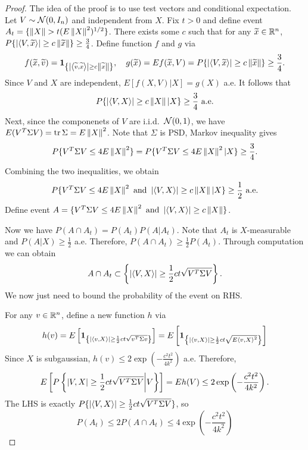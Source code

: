 \documentclass[a4paper]{article}
\begin{document}
\begin{proof}
  The idea of the proof is to use test vectors and conditional
  expectation. Let $V \sim \mathcal{N} (0, I_n)$ and independent from $X$.
  Fix $t > 0$ and define event
  $A_t = \{ \left\lVert X\right\rVert > t (E \left\lVert X\right\rVert^2)^{1/2} \}$.
  There exists some $c$ such that for any $\widetilde{x} \in \mathbb{R}^n$,
  $P \{ \left\lvert \left\langle V, \widetilde{x} \right\rangle\right\rvert \geq c \left\lVert \widetilde{x}\right\rVert \} \geq
    \frac{3}{4}$. Define function $f$ and $g$ via
  \[
    f(\widetilde{x}, \widetilde{v}) = \operatorname{\mathbf{1}}_{\left\{ \left\lvert \left\langle \widetilde{v},
        \widetilde{x} \right\rangle\right\rvert \geq c \left\lVert \widetilde{x}\right\rVert \right\}},
    \quad
    g(\widetilde{x}) = E f(\widetilde{x}, V)
    = P \{ \left\lvert \left\langle V, \widetilde{x} \right\rangle\right\rvert \geq c \left\lVert \widetilde{x}\right\rVert\}
    \geq \frac{3}{4}.
  \]
  Since $V$ and $X$ are independent, $E [f(X, V) | X] = g(X)$ a.e.
  It follows that
  \[
    P \{ \left\lvert \left\langle V, X \right\rangle\right\rvert \geq c \left\lVert X\right\rVert | X \} \geq \frac{3}{4} \text{ a.e.}
  \]
  Next, since the componenets of $V$ are i.i.d.\ $\mathcal{N}(0, 1)$,
  we have $E (V^T \Sigma V) = \operatorname{tr} \Sigma = E \left\lVert X\right\rVert^2$.
  Note that $\Sigma$ is PSD, Markov inequality gives
  \[
    P \{ V^T \Sigma V \leq 4 E \left\lVert X\right\rVert^2 \}
    = P \{ V^T \Sigma V \leq 4 E \left\lVert X\right\rVert^2 | X \}
    \geq \frac{3}{4}.
  \]
  Combining the two inequalities, we obtain
  \[
    P \{ V^T \Sigma V \leq 4 E \left\lVert X\right\rVert^2 \text{ and }
    \left\lvert \left\langle V, X \right\rangle\right\rvert \geq c \left\lVert X\right\rVert | X \}
    \geq \frac{1}{2} \text{ a.e.}
  \]
  Define event $A = \{ V^T \Sigma V \leq 4 E \left\lVert X\right\rVert^2 \text{ and }
    \left\lvert \left\langle V, X \right\rangle\right\rvert \geq c \left\lVert X\right\rVert \}$.

  Now we have $P(A \cap A_t) = P(A_t) P(A | A_t)$. Note that
  $A_t$ is $X$-measurable and $P( A | X ) \geq \frac{1}{2}$
  a.e. Therefore, $P(A \cap A_t) \geq \frac{1}{2} P(A_t)$.
  Through computation we can obtain
  \[
    A \cap A_t \subset \left\{ \left\lvert  \left\langle V, X \right\rangle \right\rvert
    \geq \frac{1}{2} ct \sqrt{V^T \Sigma V} \right\}.
  \]
  We now just need to bound the probability of the event on RHS.

  For any $v \in \mathbb{R}^n$, define a new function $h$ via
  \begin{align*}
    h (v)
    = E \left[ \operatorname{\mathbf{1}}_{ \left\{ \left\lvert \left\langle v, X \right\rangle\right\rvert \geq \frac{1}{2}
            c t \sqrt{ v^T \Sigma v} \right\} } \right]
    = E \left[ \operatorname{\mathbf{1}}_{ \left\{ \left\lvert \left\langle v, X \right\rangle\right\rvert \geq \frac{1}{2} c t
            \sqrt{E \left\langle v, X \right\rangle^2} \right\} } \right]
  \end{align*}
  Since $X$ is subgaussian, $h(v) \leq 2 \exp \left( - \frac{c^2 t^2}{4 k^2} \right)$ a.e.
  Therefore,
  \[
    E \left[ P \left\{ \left\lvert V, X\right\rvert \geq \frac{1}{2} c t \sqrt{V^T \Sigma V} \middle| V \right\} \right]
    = E h (V) \leq 2 \exp \left( - \frac{c^2 t^2}{4 k^2} \right).
  \]
  The LHS is exactly $P \{ \left\lvert \left\langle V, X \right\rangle\right\rvert \geq \frac{1}{2}
    c t \sqrt{ V^T \Sigma V } \} $, so
  \[
    P(A_t) \leq 2 P(A \cap A_t) \leq 4 \exp \left( - \frac{c^2 t^2}{4 k^2} \right)
  \]

\end{proof}
\end{document}
